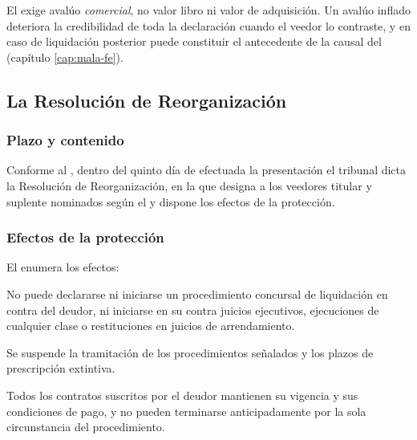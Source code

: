 \begin{alerta}
El  exige avalúo \emph{comercial}, no valor libro ni valor de adquisición. Un avalúo
inflado deteriora la credibilidad de toda la declaración cuando el veedor lo contraste, y en
caso de liquidación posterior puede constituir el antecedente de la causal del 
 (capítulo \ref{cap:mala-fe}).
\end{alerta}

\subsection{La Resolución de Reorganización}

\subsubsection{Plazo y contenido}

Conforme al , dentro del quinto día de efectuada la presentación el tribunal dicta
la Resolución de Reorganización, en la que designa a los veedores titular y suplente
nominados según el  y dispone los efectos de la protección.

\subsubsection{Efectos de la protección}

El   enumera los efectos:

\begin{description}[leftmargin=0pt,style=nextline,font=\sffamily\bfseries]
  \item[Letra a) — Inmunidad frente a la ejecución] No puede declararse ni iniciarse un
  procedimiento concursal de liquidación en contra del deudor, ni iniciarse en su contra
  juicios ejecutivos, ejecuciones de cualquier clase o restituciones en juicios de
  arrendamiento.

  \item[Letra b) — Suspensión] Se suspende la tramitación de los procedimientos señalados y
  los plazos de prescripción extintiva.

  \item[Letra c) — Vigencia de los contratos] Todos los contratos suscritos por el deudor
  mantienen su vigencia y sus condiciones de pago, y no pueden terminarse anticipadamente
  por la sola circunstancia del procedimiento.
\end{description}

